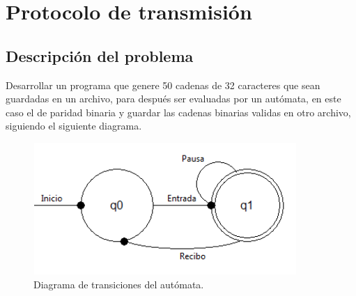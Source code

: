 \section{Protocolo de transmisión}
	\subsection{Descripción del problema}
	Desarrollar un programa que genere 50 cadenas de 32 caracteres que sean guardadas en un archivo, para después ser evaluadas por un autómata, en este caso el de paridad binaria y guardar las cadenas binarias validas en otro archivo, siguiendo el siguiente diagrama.
	\begin{figure}[H]
		\begin{center}
			\includegraphics[width=10cm, height=5cm]{img/protocolo.png}
			\caption{Diagrama de transiciones del autómata. \cite{WEB}}
			\label{fig:diagrama3}
		\end{center}
	\end{figure}
